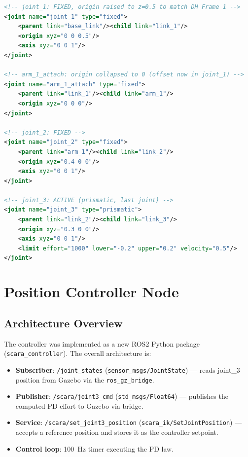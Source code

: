 \documentclass[12pt]{article}
\begin{document}
\begin{lstlisting}[style=ros, language=XML,
    caption={Fixed URDF joints. Joint 1 origin corrected to z=0.5;
             joints 1 and 2 set to fixed type.}]
<!-- joint_1: FIXED, origin raised to z=0.5 to match DH Frame 1 -->
<joint name="joint_1" type="fixed">
    <parent link="base_link"/><child link="link_1"/>
    <origin xyz="0 0 0.5"/>
    <axis xyz="0 0 1"/>
</joint>

<!-- arm_1_attach: origin collapsed to 0 (offset now in joint_1) -->
<joint name="arm_1_attach" type="fixed">
    <parent link="link_1"/><child link="arm_1"/>
    <origin xyz="0 0 0"/>
</joint>

<!-- joint_2: FIXED -->
<joint name="joint_2" type="fixed">
    <parent link="arm_1"/><child link="link_2"/>
    <origin xyz="0.4 0 0"/>
    <axis xyz="0 0 1"/>
</joint>

<!-- joint_3: ACTIVE (prismatic, last joint) -->
<joint name="joint_3" type="prismatic">
    <parent link="link_2"/><child link="link_3"/>
    <origin xyz="0.3 0 0"/>
    <axis xyz="0 0 1"/>
    <limit effort="1000" lower="-0.2" upper="0.2" velocity="0.5"/>
</joint>
\end{lstlisting}

\section{Position Controller Node}

\subsection{Architecture Overview}

The controller was implemented as a new ROS2 Python package
(\texttt{scara\_controller}). The overall architecture is:

\begin{itemize}
    \item \textbf{Subscriber}: \texttt{/joint\_states}
          (\texttt{sensor\_msgs/JointState}) --- reads joint\_3 position
          from Gazebo via the \texttt{ros\_gz\_bridge}.
    \item \textbf{Publisher}: \texttt{/scara/joint3\_cmd}
          (\texttt{std\_msgs/Float64}) --- publishes the computed PD effort
          to Gazebo via bridge.
    \item \textbf{Service}: \texttt{/scara/set\_joint3\_position}
          (\texttt{scara\_ik/SetJointPosition}) --- accepts a reference
          position and stores it as the controller setpoint.
    \item \textbf{Control loop}: 100~Hz timer executing the PD law.
\end{itemize}
\end{document}
